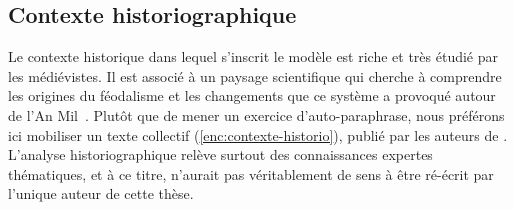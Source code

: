 \subsection{Contexte historiographique \label{subsec:contexte-historio}}

Le contexte historique dans lequel s'inscrit le modèle \simfeodal{} est riche et très étudié par les médiévistes.
Il est associé à un paysage scientifique qui cherche à comprendre les origines du féodalisme et les changements que ce système a provoqué autour de l'\og{}An Mil\fg{}~\autocite{duby1967mil}.
Plutôt que de mener un exercice d'\og{}auto-paraphrase\fg{}, nous préférons ici mobiliser un texte collectif (\cref{enc:contexte-historio}), publié par les auteurs de \simfeodal{} \autocite[Introduction du chapitre]{cura_transition_2017}.
L'analyse historiographique relève surtout des connaissances expertes thématiques, et à ce titre, n'aurait pas véritablement de sens à être ré-écrit par l'unique auteur de cette thèse.

